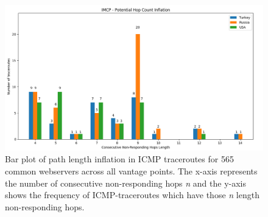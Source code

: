 \begin{figure}[!h]
\centering
  \includegraphics[width=\linewidth]{figures/missing-hops-bar.png}
  \caption{Bar plot of path length inflation in ICMP traceroutes for 565 common webservers across all vantage points. The x-axis represents the number of consecutive non-responding hops \textit{n} and the y-axis shows the frequency of ICMP-traceroutes which have those \textit{n} length non-responding hops.}
  \label{fig:inflated-path-bar}
\end{figure}
